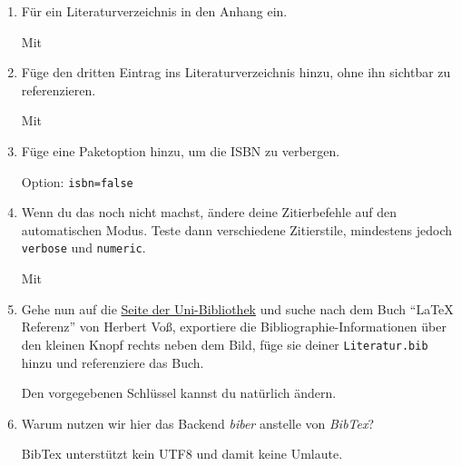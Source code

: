 \begin{enumerate}
        \item Für ein Literaturverzeichnis in den Anhang ein.
            \begin{loesung}
                Mit 
            \end{loesung}
        
        \item Füge den dritten Eintrag ins Literaturverzeichnis hinzu, ohne ihn
            sichtbar zu referenzieren.
            \begin{loesung}
                Mit 
            \end{loesung}
        
        \item Füge eine Paketoption hinzu, um die ISBN zu verbergen.
            \begin{loesung}
                Option: \verb|isbn=false|
            \end{loesung}
        
        \item Wenn du das noch nicht machst, ändere deine Zitierbefehle auf den
            automatischen Modus. Teste dann verschiedene Zitierstile, mindestens
            jedoch \texttt{verbose} und \texttt{numeric}.
            \begin{loesung}
                Mit 
            \end{loesung}
        
        \item Gehe nun auf die \href{http://www.suub.uni-bremen.de/}{Seite der
            Uni-Bibliothek} und suche nach dem Buch \enquote{LaTeX Referenz}
            von Herbert Voß, exportiere die Bibliographie-Informationen über den
            kleinen Knopf rechts neben dem Bild, füge sie deiner
            \texttt{Literatur.bib} hinzu und referenziere das Buch.
            \begin{hinweis}
                Den vorgegebenen Schlüssel kannst du natürlich ändern.
            \end{hinweis}
        
        \item Warum nutzen wir hier das Backend \emph{biber} anstelle von
            \emph{BibTex}?
            \begin{loesung}
                BibTex unterstützt kein UTF8 und damit keine Umlaute.
            \end{loesung}
    \end{enumerate}

\begin{figure}[p!]

\end{figure}

